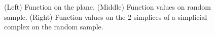 \begin{figure}[htbp]
     \caption{(Left) Function on the plane.
        (Middle) Function values on random sample.
        (Right) Function values on the 2-simplices of a simplicial complex on the random sample.}
     \label{fig:function}
 \end{figure}

